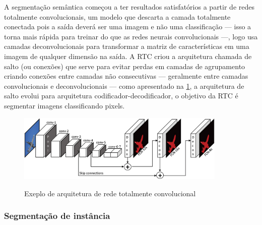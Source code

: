 A segmentação semântica começou a ter resultados satisfatórios a partir de redes totalmente convolucionais, um modelo que descarta a camada totalmente conectada pois a saída deverá ser uma imagem e não uma classificação — isso a torna mais rápida para treinar do que as redes neurais convolucionais —, logo usa camadas deconvolucionais para transformar a matriz de características em uma imagem de qualquer dimensão na saída. A RTC criou a arquitetura chamada de salto (ou conexões) que serve para evitar perdas em camadas de agrupamento criando conexões entre camadas não consecutivas — geralmente entre camadas convolucionais e deconvolucionais — como apresentado na \cref{fig:rtc}, a arquitetura de salto evolui para arquitetura codificador-decodificador, o objetivo da RTC é segmentar imagens classificando pixels.
\begin{figure}[H]
	\caption{Exeplo de arquitetura de rede totalmente convolucional}
	\centering %
	\includegraphics[width=10cm]{figures/redes_totalmente_convolucionais.jpeg} %
	\label{fig:rtc}
\end{figure}




\subsubsection*{Segmentação de instância}


